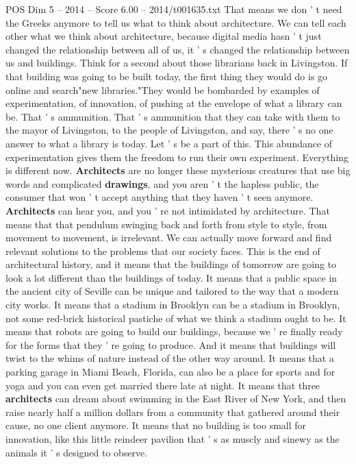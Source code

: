 \begin{textsample}{POS Dim 5 – 2014 – Score 6.00 – 2014/t001635.txt}
That means we don ' t need the Greeks anymore to tell us what to think about architecture.
We can tell each other what we think about architecture, because digital media hasn ' t just changed the relationship between all of us, it ' s changed the relationship between us and buildings.
Think for a second about those librarians back in Livingston.
If that building was going to be built today, the first thing they would do is go online and search"new libraries."They would be bombarded by examples of experimentation, of innovation, of pushing at the envelope of what a library can be.
That ' s ammunition.
That ' s ammunition that they can take with them to the mayor of Livingston, to the people of Livingston, and say, there ' s no one answer to what a library is today.
Let ' s be a part of this.
This abundance of experimentation gives them the freedom to run their own experiment.
Everything is different now. \textbf{Architects} are no longer these mysterious creatures that use big words and complicated \textbf{drawings}, and you aren ' t the hapless public, the consumer that won ' t accept anything that they haven ' t seen anymore. \textbf{Architects} can hear you, and you ' re not intimidated by architecture.
That means that that pendulum swinging back and forth from style to style, from movement to movement, is irrelevant.
We can actually move forward and find relevant solutions to the problems that our society faces.
This is the end of architectural history, and it means that the buildings of tomorrow are going to look a lot different than the buildings of today.
It means that a public space in the ancient city of Seville can be unique and tailored to the way that a modern city works.
It means that a stadium in Brooklyn can be a stadium in Brooklyn, not some red-brick historical pastiche of what we think a stadium ought to be.
It means that robots are going to build our buildings, because we ' re finally ready for the forms that they ' re going to produce.
And it means that buildings will twist to the whims of nature instead of the other way around.
It means that a parking garage in Miami Beach, Florida, can also be a place for sports and for yoga and you can even get married there late at night.
It means that three \textbf{architects} can dream about swimming in the East River of New York, and then raise nearly half a million dollars from a community that gathered around their cause, no one client anymore.
It means that no building is too small for innovation, like this little reindeer pavilion that ' s as muscly and sinewy as the animals it ' s designed to observe.

\end{textsample}
